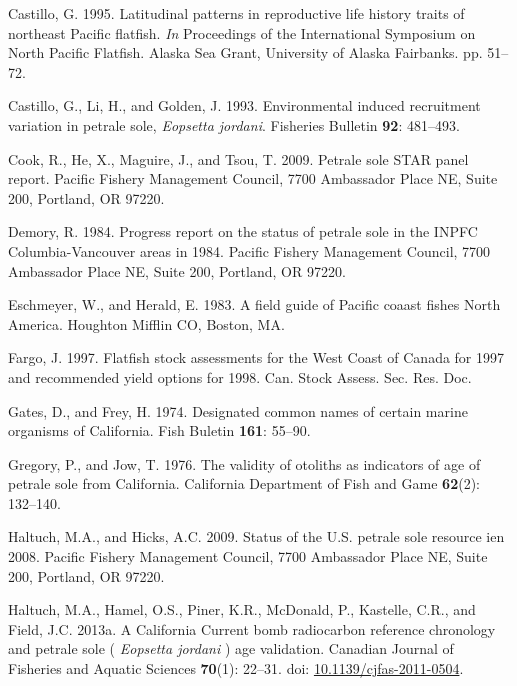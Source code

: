 \documentclass[12pt,]{article}
\begin{document}
\hypertarget{ref-castillo_latitudinal_1995}{}
Castillo, G. 1995. Latitudinal patterns in reproductive life history
traits of northeast Pacific flatfish. \emph{In} Proceedings of the
International Symposium on North Pacific Flatfish. Alaska Sea Grant,
University of Alaska Fairbanks. pp. 51--72.

\hypertarget{ref-castillo_g.c._environmental_1993}{}
Castillo, G., Li, H., and Golden, J. 1993. Environmental induced
recruitment variation in petrale sole, \emph{Eopsetta jordani}.
Fisheries Bulletin \textbf{92}: 481--493.

\hypertarget{ref-cook_petrale_2009}{}
Cook, R., He, X., Maguire, J., and Tsou, T. 2009. Petrale sole STAR
panel report. Pacific Fishery Management Council, 7700 Ambassador Place
NE, Suite 200, Portland, OR 97220.

\hypertarget{ref-demory_progress_1984}{}
Demory, R. 1984. Progress report on the status of petrale sole in the
INPFC Columbia-Vancouver areas in 1984. Pacific Fishery Management
Council, 7700 Ambassador Place NE, Suite 200, Portland, OR 97220.

\hypertarget{ref-eschmeyer_field_1983}{}
Eschmeyer, W., and Herald, E. 1983. A field guide of Pacific coaast
fishes North America. Houghton Mifflin CO, Boston, MA.

\hypertarget{ref-fargo_j.j._flatfish_1997}{}
Fargo, J. 1997. Flatfish stock assessments for the West Coast of Canada
for 1997 and recommended yield options for 1998. Can. Stock Assess. Sec.
Res. Doc.

\hypertarget{ref-gates_designated_1974}{}
Gates, D., and Frey, H. 1974. Designated common names of certain marine
organisms of California. Fish Buletin \textbf{161}: 55--90.

\hypertarget{ref-gregory_validity_1976}{}
Gregory, P., and Jow, T. 1976. The validity of otoliths as indicators of
age of petrale sole from California. California Department of Fish and
Game \textbf{62}(2): 132--140.

\hypertarget{ref-haltuch_status_2009}{}
Haltuch, M.A., and Hicks, A.C. 2009. Status of the U.S. petrale sole
resource ien 2008. Pacific Fishery Management Council, 7700 Ambassador
Place NE, Suite 200, Portland, OR 97220.

\hypertarget{ref-haltuch_california_2013}{}
Haltuch, M.A., Hamel, O.S., Piner, K.R., McDonald, P., Kastelle, C.R.,
and Field, J.C. 2013a. A California Current bomb radiocarbon reference
chronology and petrale sole ( \emph{Eopsetta jordani} ) age validation.
Canadian Journal of Fisheries and Aquatic Sciences \textbf{70}(1):
22--31. doi:
\href{https://doi.org/10.1139/cjfas-2011-0504}{10.1139/cjfas-2011-0504}.
\end{document}
